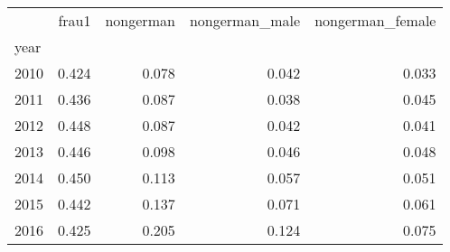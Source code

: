 \begin{tabular}{lrrrr}
\toprule
 & frau1 & nongerman & nongerman_male & nongerman_female \\
year &  &  &  &  \\
\midrule
2010 & 0.424 & 0.078 & 0.042 & 0.033 \\
2011 & 0.436 & 0.087 & 0.038 & 0.045 \\
2012 & 0.448 & 0.087 & 0.042 & 0.041 \\
2013 & 0.446 & 0.098 & 0.046 & 0.048 \\
2014 & 0.450 & 0.113 & 0.057 & 0.051 \\
2015 & 0.442 & 0.137 & 0.071 & 0.061 \\
2016 & 0.425 & 0.205 & 0.124 & 0.075 \\
\bottomrule
\end{tabular}

